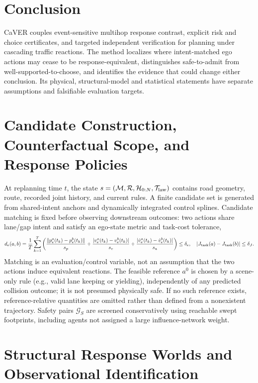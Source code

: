 \documentclass[10pt]{article}
\begin{document}
\section{Conclusion}
CaVER couples event-sensitive multihop response contrast, explicit risk and choice certificates, and targeted independent verification for planning under cascading traffic reactions. The method localizes where intent-matched ego actions may cease to be response-equivalent, distinguishes safe-to-admit from well-supported-to-choose, and identifies the evidence that could change either conclusion. Its physical, structural-model and statistical statements have separate assumptions and falsifiable evaluation targets.

\appendix
\section{Candidate Construction, Counterfactual Scope, and Response Policies}
\label{app:actions}
At replanning time $t$, the state $s=(\mathcal M,\mathcal R,\mathcal H_{0:N},\mathcal T_{\rm law})$ contains road geometry, route, recorded joint history, and current rules. A finite candidate set is generated from shared-intent anchors and dynamically integrated control splines. Candidate matching is fixed before observing downstream outcomes: two actions share lane/gap intent and satisfy an ego-state metric and task-cost tolerance,
\begin{equation}
 d_e(a,b)=\frac1T\sum_{k=1}^{T}\left(
 \frac{\|p_e^a(t_k)-p_e^b(t_k)\|}{s_p}+
 \frac{|v_e^a(t_k)-v_e^b(t_k)|}{s_v}+
 \frac{|\dot v_e^a(t_k)-\dot v_e^b(t_k)|}{s_a}\right)
 \le\delta_e,\quad |J_{\rm task}(a)-J_{\rm task}(b)|\le\delta_J.
 \label{eq:matchapp}
\end{equation}
Matching is an evaluation/control variable, not an assumption that the two actions induce equivalent reactions. The feasible reference $a^0$ is chosen by a scene-only rule (e.g., valid lane keeping or yielding), independently of any predicted collision outcome; it is not presumed physically safe. If no such reference exists, reference-relative quantities are omitted rather than defined from a nonexistent trajectory. Safety pairs $\mathcal G_S$ are screened conservatively using reachable swept footprints, including agents not assigned a large influence-network weight.

\section{Structural Response Worlds and Observational Identification}
\label{app:world}
\end{document}
